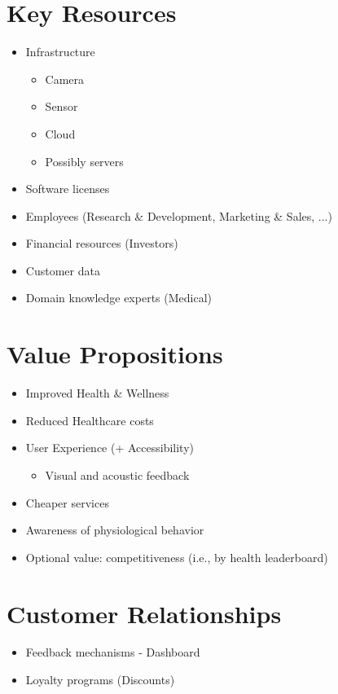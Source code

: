 \section{Key Resources}
\begin{itemize}
    \item Infrastructure
        \begin{itemize}
            \item Camera
            \item Sensor
            \item Cloud
            \item Possibly servers
        \end{itemize}
    \item Software licenses
    \item Employees (Research \& Development, Marketing \& Sales, ...)
    \item Financial resources (Investors)
    \item Customer data
    \item Domain knowledge experts (Medical)
\end{itemize}

\section{Value Propositions}
\begin{itemize}
    \item Improved Health \& Wellness
    \item Reduced Healthcare costs
    \item User Experience (+ Accessibility)
        \begin{itemize}
            \item Visual and acoustic feedback
        \end{itemize}
    \item Cheaper services
    \item Awareness of physiological behavior
    \item Optional value: competitiveness (i.e., by health leaderboard)
\end{itemize}

\section{Customer Relationships}
\begin{itemize}
    \item Feedback mechanisms - Dashboard
    \item Loyalty programs (Discounts)
\end{itemize}

